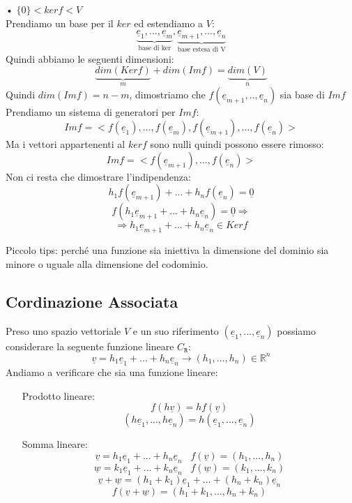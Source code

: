 \begin{itemize}
\subitem • $\{0\} < ker f < V$\\
Prendiamo un base per il $ker$ ed estendiamo a $V$:
$$ \underbrace{\underline{e}_1,...,\underline{e}_m}_{\text{base di ker}},\underbrace{\underline{e}_{m+1},...,\underline{e}_n}_{\text{base estesa di V}}$$
Quindi abbiamo le seguenti dimensioni:
$$ \underbrace{dim(Ker f)}_m  + dim(Im f) = \underbrace{dim(V)}_n  $$
Quindi $dim(Im f) = n-m$, dimostriamo che $f(\underline{e}_{m+1},..,\underline{e}_n)$ sia base di $Im f$\\
Prendiamo un sistema di generatori per $Im f$:
$$ Im f = <f(\underline{e}_1),...,f(\underline{e}_m),f(\underline{e}_{m+1}),...,f(\underline{e}_n)>$$
Ma i vettori appartenenti al $ker f$ sono nulli quindi possono essere rimosso:
$$ Im f = <f(\underline{e}_{m+1}),...,f(\underline{e}_n)>$$
Non ci resta che dimostrare l'indipendenza:
$$ h_1f(\underline{e}_{m+1})+...+h_nf(\underline{e}_{n}) = \underline{0}$$
$$ f(h_1\underline{e}_{m+1}+...+h_n\underline{e}_{n}) = \underline{0} \Rightarrow$$
$$ \Rightarrow  h_1\underline{e}_{m+1}+...+h_n\underline{e}_{n} \in Ker f$$



\end{itemize}
Piccolo tips: perché una funzione sia iniettiva la dimensione del dominio sia minore o uguale alla dimensione del codominio.

\subsection{Cordinazione Associata}
Preso uno spazio vettoriale $V$ e un suo riferimento $(\underline{e}_1,...,\underline{e}_n)$ possiamo considerare la seguente funzione lineare $C_{\mathtt{R}}$:
$$ \underline{v} = h_1\underline{e}_1+...+h_n\underline{e}_n \rightarrow (h_1,...,h_n) \in \mathbb{R}^n $$
Andiamo a verificare che sia una funzione lineare:
\begin{itemize}
\item[Prodotto lineare:]
$$ f(h\underline{v}) = hf(\underline{v}) $$
$$ (h\underline{e}_1,...,h\underline{e}_n)= h(\underline{e}_1,...,\underline{e}_n)$$

\item[Somma lineare:]
$$ \underline{v} = h_1\underline{e}_1+...+h_n\underline{e}_n \;\;\; f(\underline{v})=(h_1,...,h_n) $$
$$ \underline{w} = k_1\underline{e}_1+...+k_n\underline{e}_n \;\;\; f(\underline{w})=(k_1,...,k_n) $$
$$ \underline{v}+\underline{w}= (h_1+k_1)\underline{e}_1+...+(h_n+k_n)\underline{e}_n $$
$$ f(\underline{v} +\underline{w}) = (h_1+k_1,...,h_n+k_n) $$
\end{itemize}


